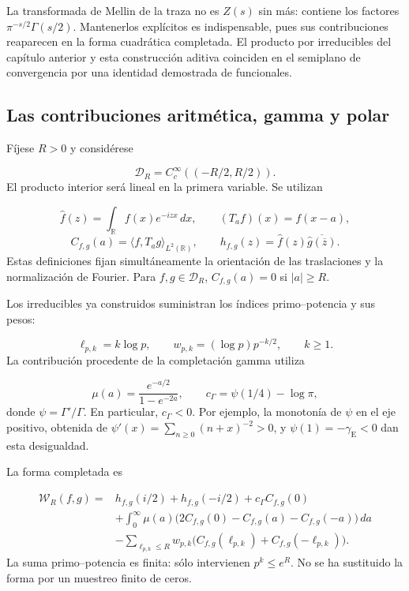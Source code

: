 La transformada de Mellin de la traza no es \(Z(s)\) sin más: contiene los factores \(\pi^{-s/2}\Gamma(s/2)\). Mantenerlos explícitos es indispensable, pues sus contribuciones reaparecen en la forma cuadrática completada. El producto por irreducibles del capítulo anterior y esta construcción aditiva coinciden en el semiplano de convergencia por una identidad demostrada de funcionales.

\subsection{Las contribuciones aritmética, gamma y polar}
\label{rz:forma}
Fíjese \(R>0\) y considérese

\[
\mathcal D_R=C_c^\infty((-R/2,R/2)).
\]
El producto interior será lineal en la primera variable. Se utilizan

\[
\widehat f(z)=\int_{\mathbb R}f(x)e^{-izx}\,dx,\qquad
(T_af)(x)=f(x-a),
\]
\[
C_{f,g}(a)=\langle f,T_ag\rangle_{L^2(\mathbb R)},\qquad
h_{f,g}(z)=\widehat f(z)\overline{\widehat g(\overline z)}.
\]
Estas definiciones fijan simultáneamente la orientación de las traslaciones y la normalización de Fourier. Para \(f,g\in\mathcal D_R\), \(C_{f,g}(a)=0\) si \(|a|\geq R\).

Los irreducibles ya construidos suministran los índices primo–potencia y sus pesos:

\[
\ell_{p,k}=k\log p,\qquad
w_{p,k}=(\log p)p^{-k/2},\qquad k\geq1.
\]
La contribución procedente de la completación gamma utiliza

\[
\mu(a)=\frac{e^{-a/2}}{1-e^{-2a}},\qquad
c_\Gamma=\psi(1/4)-\log\pi,
\]
donde \(\psi=\Gamma'/\Gamma\). En particular, \(c_\Gamma<0\). Por ejemplo, la monotonía de \(\psi\) en el eje positivo, obtenida de \(\psi'(x)=\sum_{n\geq0}(n+x)^{-2}>0\), y \(\psi(1)=-\gamma_{\mathrm E}<0\) dan esta desigualdad.

La forma completada es

\[
\begin{aligned}
\mathscr W_R(f,g)={}&h_{f,g}(i/2)+h_{f,g}(-i/2)
+c_\Gamma C_{f,g}(0)\\
&+\int_0^\infty\mu(a)
\bigl(2C_{f,g}(0)-C_{f,g}(a)-C_{f,g}(-a)\bigr)\,da\\
&-\sum_{\ell_{p,k}\leq R}w_{p,k}
\bigl(C_{f,g}(\ell_{p,k})+C_{f,g}(-\ell_{p,k})\bigr).
\end{aligned}
\]
La suma primo–potencia es finita: sólo intervienen \(p^k\leq e^R\). No se ha sustituido la forma por un muestreo finito de ceros.

